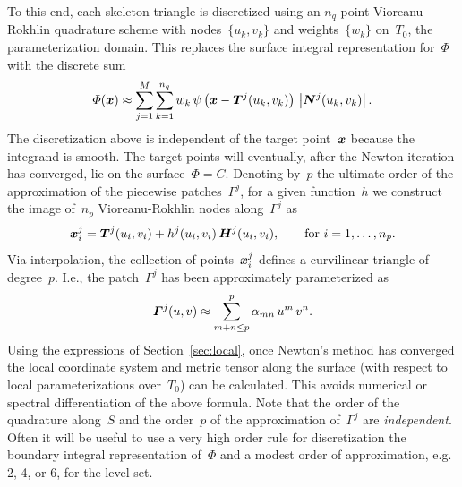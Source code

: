 \documentclass[11pt]{article}
\numberwithin{equation}{section}
\newcommand{\vct}{\vectorsym}
\newcommand{\lp}{\left(}
\newcommand{\rp}{\right)}
\newcommand\bx{\vct{x}}
\begin{document}
To this end, each skeleton triangle is discretized using an
$n_q$-point Vioreanu-Rokhlin quadrature scheme with nodes~$\{
u_k,v_k\}$ and weights~$\{ w_k \}$ on~$T_0$, the parameterization
domain.
This replaces the surface integral representation for~$\Phi$ with the
discrete sum
\begin{equation}
  \Phi(\bx) \approx \sum_{j = 1}^M \sum_{k = 1}^{n_q} w_k \, \psi \lp
  \bx-\vct{T}^j(u_k,v_k)\rp \, \left| \vct{N}^j(u_k,v_k) \right|.
\end{equation}
The discretization above is independent of the target point~$\bx$
because the integrand is smooth.  The target points will eventually,
after the Newton iteration has converged, lie on the
surface~$\Phi = C$. Denoting by~$p$ the ultimate order of the
approximation of the piecewise patches~$\Gamma^j$, for a given
function~$h$ we construct the image of~$n_p$ Vioreanu-Rokhlin nodes
along~$\Gamma^j$ as
\begin{equation}
  \bx^j_i = \vct{T}^j(u_i,v_i) + h^j(u_i,v_i) \, \vct{H}^j(u_i,v_i),
  \qquad \text{for } i = 1,\ldots,n_p.
\end{equation}
Via interpolation, the collection of points~$\bx^j_i$ defines a
curvilinear triangle of degree~$p$. I.e., the patch~$\Gamma^j$ has
been approximately parameterized as
\begin{equation}
  \vct{\Gamma}^j(u,v) \approx \sum_{m+n \leq p}^p \alpha_{mn} \, u^m
  \, v^n.
\end{equation}
Using the expressions of Section~\ref{sec:local}, once Newton's method
has converged the local coordinate system and metric tensor along the
surface (with respect to local parameterizations over~$T_0$) can be
calculated. This avoids numerical or spectral differentiation of the
above formula.
Note that the order of the quadrature along~$S$ and the order~$p$ of
the approximation of~$\Gamma^j$ are \emph{independent}. Often it will
be useful to use a very high order rule for discretization the
boundary integral representation of~$\Phi$ and a modest order of
approximation, e.g. 2, 4, or 6, for the level set.
\end{document}
